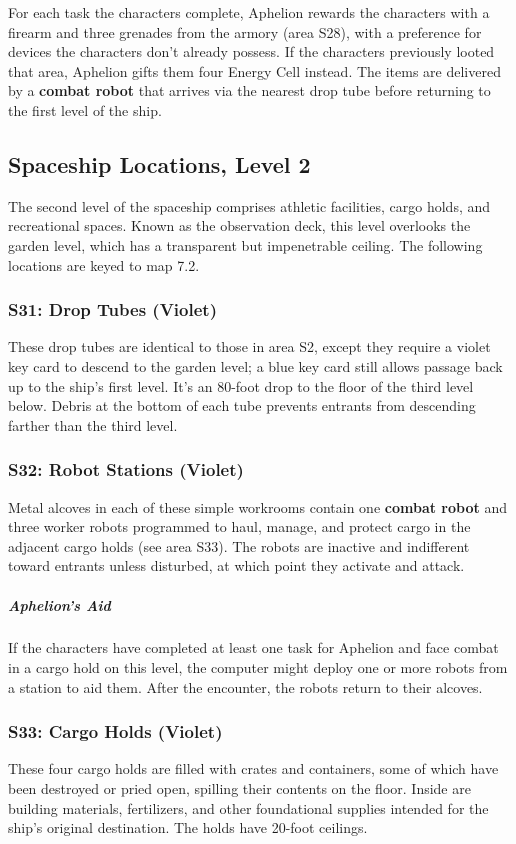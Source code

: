 \documentclass[10pt,a4paper,twoside,bg=print,twocolumn,openany,nodeprecatedcode]{dndbook}
\begin{document}
For each task the characters complete, Aphelion rewards the characters with a firearm and three grenades from the armory (area S28), with a preference for devices the characters don't already possess. If the characters previously looted that area, Aphelion gifts them four Energy Cell instead. The items are delivered by a \textbf{combat robot} that arrives via the nearest drop tube before returning to the first level of the ship.

\subsection{Spaceship Locations, Level 2}
The second level of the spaceship comprises athletic facilities, cargo holds, and recreational spaces. Known as the observation deck, this level overlooks the garden level, which has a transparent but impenetrable ceiling. The following locations are keyed to map 7.2.

\subsubsection{S31: Drop Tubes (Violet)}
These drop tubes are identical to those in area S2, except they require a violet key card to descend to the garden level; a blue key card still allows passage back up to the ship's first level. It's an 80-foot drop to the floor of the third level below. Debris at the bottom of each tube prevents entrants from descending farther than the third level.

\subsubsection{S32: Robot Stations (Violet)}
Metal alcoves in each of these simple workrooms contain one \textbf{combat robot} and three worker robots programmed to haul, manage, and protect cargo in the adjacent cargo holds (see area S33). The robots are inactive and indifferent toward entrants unless disturbed, at which point they activate and attack.

\subparagraph{Aphelion's Aid}
If the characters have completed at least one task for Aphelion and face combat in a cargo hold on this level, the computer might deploy one or more robots from a station to aid them. After the encounter, the robots return to their alcoves.

\subsubsection{S33: Cargo Holds (Violet)}
These four cargo holds are filled with crates and containers, some of which have been destroyed or pried open, spilling their contents on the floor. Inside are building materials, fertilizers, and other foundational supplies intended for the ship's original destination. The holds have 20-foot ceilings.
\end{document}
